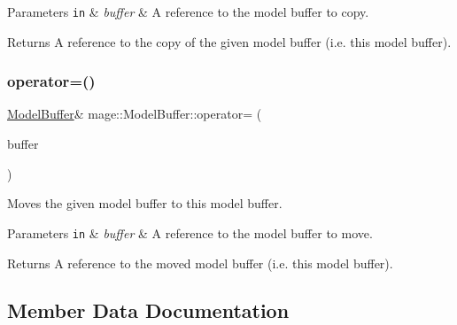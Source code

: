 \begin{DoxyParams}[1]{Parameters}
\mbox{\tt in}  & {\em buffer} & A reference to the model buffer to copy. \\
\hline
\end{DoxyParams}
\begin{DoxyReturn}{Returns}
A reference to the copy of the given model buffer (i.\+e. this model buffer). 
\end{DoxyReturn}
\hypertarget{structmage_1_1_model_buffer_a2f2c8c5ec6a43c239f349e3c015320e0}{}\label{structmage_1_1_model_buffer_a2f2c8c5ec6a43c239f349e3c015320e0} 
\subsubsection{\texorpdfstring{operator=()}{operator=()}\hspace{0.1cm}{\footnotesize\ttfamily [2/2]}}
{\footnotesize\ttfamily \hyperlink{structmage_1_1_model_buffer}{Model\+Buffer}\& mage\+::\+Model\+Buffer\+::operator= (\begin{DoxyParamCaption}\item[{\hyperlink{structmage_1_1_model_buffer}{Model\+Buffer} \&\&}]{buffer }\end{DoxyParamCaption})\hspace{0.3cm}{\ttfamily [default]}}

Moves the given model buffer to this model buffer.


\begin{DoxyParams}[1]{Parameters}
\mbox{\tt in}  & {\em buffer} & A reference to the model buffer to move. \\
\hline
\end{DoxyParams}
\begin{DoxyReturn}{Returns}
A reference to the moved model buffer (i.\+e. this model buffer). 
\end{DoxyReturn}


\subsection{Member Data Documentation}
\hypertarget{structmage_1_1_model_buffer_aaad37de854c5ba951107d2c18880fbbd}{}\label{structmage_1_1_model_buffer_aaad37de854c5ba951107d2c18880fbbd} 
